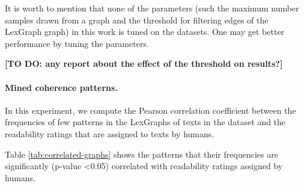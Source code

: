It is worth to mention that none of the parameters (such the maximum number samples drawn from a graph and the threshold for filtering edges of the LexGraph graph) in this work is tuned on the datasets. 
One may get better performance by tuning the parameters.

\textbf{[TO DO: any report about the effect of the threshold on results?]}

\paragraph{Mined coherence patterns.}
In this experiment, we compute the Pearson correlation coefficient between the frequencies of few patterns in the LexGraphs of texts in the \pitlerds dataset and the readability ratings that are assigned to texts by humans. 

Table \ref{tab:correlated-graphs} shows the patterns that their frequencies are significantly (p-value <0.05) correlated with readability ratings assigned by humans. 

